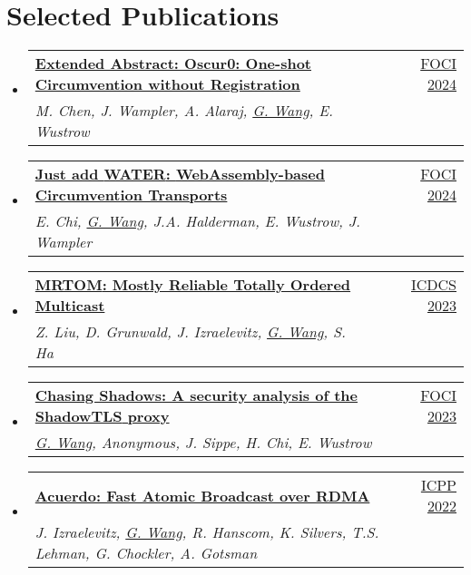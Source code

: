 \documentclass[letterpaper,11pt]{article}
\makeatletter
\newcommand{\resumeSubheading}[4]{
  \vspace{-2pt}\item
    \begin{tabular*}{0.97\textwidth}[t]{l@{\extracolsep{\fill}}r}
      \textbf{#1} & #2 \\
      \textit{\small#3} & \textit{\small #4} \\
    \end{tabular*}\vspace{-7pt}
}
\newcommand{\resumeSubHeadingListStart}{\begin{itemize}[leftmargin=0.15in, label={}]}
\newcommand{\resumeSubHeadingListEnd}{\end{itemize}}
\makeatother
\begin{document}
\section{Selected Publications}
\resumeSubHeadingListStart
  \resumeSubheading
  {\href{https://www.petsymposium.org/foci/2024/foci-2024-0005.php}{\textbf{Extended Abstract: Oscur0: One-shot Circumvention without Registration}}}{\href{https://foci.community/foci24.html}{FOCI 2024}}
  {M. Chen, J. Wampler, A. Alaraj, \underline{G. Wang}, E. Wustrow}{}
  \resumeSubheading
  {\href{https://www.petsymposium.org/foci/2024/foci-2024-0003.php}{\textbf{Just add {WATER}: {WebAssembly}-based Circumvention Transports}}}{\href{https://foci.community/foci24.html}{FOCI 2024}}
  {E. Chi, \underline{G. Wang}, J.A. Halderman, E. Wustrow, J. Wampler}{}
  \resumeSubheading
  {\href{https://ieeexplore.ieee.org/document/10272412}{\textbf{{MRTOM}: Mostly Reliable Totally Ordered Multicast}}}{\href{https://icdcs2023.icdcs.org/}{ICDCS 2023}}
  {Z. Liu, D. Grunwald, J. Izraelevitz, \underline{G. Wang}, S. Ha}{}
  \resumeSubheading
  {\href{https://www.petsymposium.org/foci/2023/foci-2023-0002.php}{\textbf{{Chasing Shadows}: A security analysis of the {ShadowTLS} proxy}}}{\href{https://foci.community/foci23.html}{FOCI 2023}}
  {\underline{G. Wang}, Anonymous, J. Sippe, H. Chi, E. Wustrow}{}
  \resumeSubheading
  {\href{https://dl.acm.org/doi/abs/10.1145/3545008.3545041}{\textbf{Acuerdo: Fast Atomic Broadcast over {RDMA}}}}{\href{https://icpp22.gitlabpages.inria.fr/}{ICPP 2022}}
  {J. Izraelevitz, \underline{G. Wang}, R. Hanscom, K. Silvers, T.S. Lehman, G. Chockler, A. Gotsman}{}
\resumeSubHeadingListEnd
\vspace{1pt}

\end{document}
